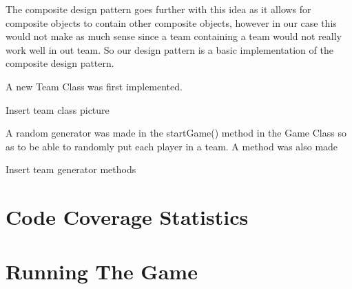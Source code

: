 \documentclass[a4paper,12pt]{extarticle}
\begin{document}
The composite design pattern goes further with this idea as it allows for composite objects to contain other composite objects, however in our case this would not make as much sense since a team containing a team would not really work well in out team. So our design pattern is a basic implementation of the composite design pattern.

A new Team Class was first implemented. 

Insert team class picture

A random generator was made in the startGame() method in the Game Class so as to be able to randomly put each player in a team. A method was also made 

Insert team generator methods




\section{Code Coverage Statistics}

\section{Running The Game}
\end{document}
